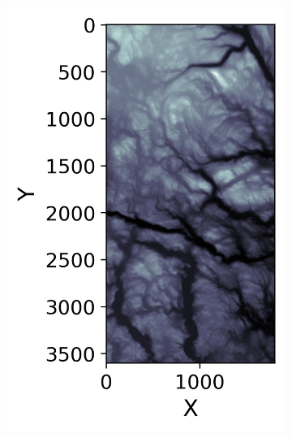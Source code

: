 \documentclass[../main.tex]{subfiles}
\begin{document}
\begin{figure}[H] 
   \centering
   \begin{subfigure}[b]{0.35\textwidth}
    \centering
    \includegraphics[width=\textwidth]{../assets/Terrain_SRTM_data_norway_1.png} 
    \caption{}
    \label{fig:terrain_Norway}
   \end{subfigure}
   \quad
   \begin{subfigure}[b]{0.55\textwidth}
    \centering

\end{subfigure}
\end{figure}
\end{document}
